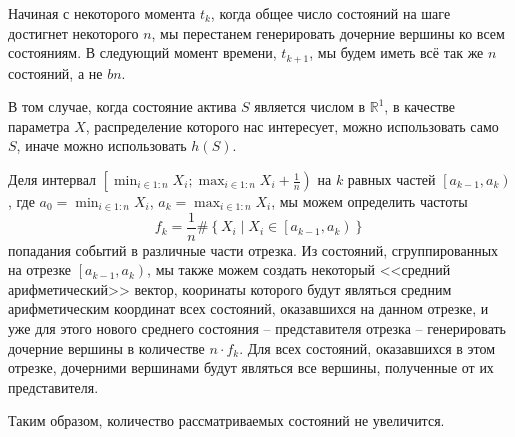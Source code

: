\documentclass[12pt,twoside,titlepage,сa4paper]{article}
\newcommand{\R}{\ensuremath{\mathbb{R}}}
\begin{document}
	\par Начиная с некоторого момента $t_k$, когда общее число состояний на шаге достигнет некоторого $n$, мы перестанем генерировать дочерние вершины ко всем состояниям. В следующий момент времени, $t_{k+1}$, мы будем иметь всё так же $n$ состояний, а не $bn$. 
	\par В том случае, когда состояние актива $S$ является числом в $\R ^1$, в качестве параметра $X$, распределение которого нас интересует, можно использовать  само $S$, иначе можно использовать $h(S)$. 
	\par Деля интервал $\left[\min_{i\in 1:n} X_i ; \max_{i\in 1:n} X_i + \frac{1}{n}\right)$ на $k$ равных частей $\left[a_{k-1},a_k\right)$, где $a_0 = \min_{i\in 1:n} X_i$, $a_k = \max_{i\in 1:n} X_i$, мы можем определить частоты \[f_k = \frac{1}{n}\#\left\lbrace X_i \middle\vert X_i\in\left[a_{k-1},a_k\right)\right\rbrace\] попадания событий в различные части отрезка. Из состояний, сгруппированных на отрезке $\left[a_{k-1},a_k\right)$, мы также можем создать некоторый <<средний арифметический>> вектор, кооринаты которого будут являться средним арифметическим координат всех состояний, оказавшихся на данном отрезке, и уже для этого нового среднего состояния -- представителя отрезка -- генерировать дочерние вершины в количестве $n\cdot f_k$. Для всех состояний, оказавшихся в этом отрезке, дочерними вершинами будут являться все вершины, полученные от их представителя. 
	\par Таким образом, количество рассматриваемых состояний не увеличится.
\end{document}
